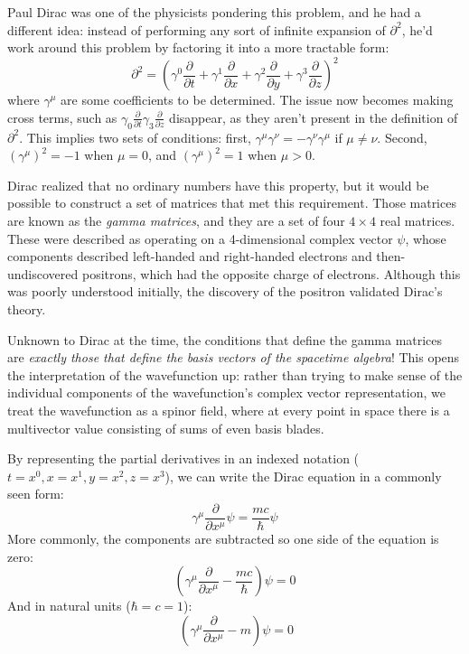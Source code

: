 Paul Dirac was one of the physicists pondering this problem, and he had a different idea: instead of
performing any sort of infinite expansion of $\partial^2$, he'd work around this problem by
factoring it into a more tractable form:
$$
\partial^2 = \left(\gamma^0 \frac{\partial}{\partial t} +
\gamma^1 \frac{\partial}{\partial x} +
\gamma^2 \frac{\partial}{\partial y} +
\gamma^3 \frac{\partial}{\partial z}
\right)^2
$$
where $\gamma^\mu$ are some coefficients to be determined. The issue now becomes making cross terms,
such as $\gamma_0 \frac{\partial}{\partial t} \gamma_3 \frac{\partial}{\partial z}$ disappear, as
they aren't present in the definition of $\partial^2$. This implies two sets of conditions: first,
$\gamma^\mu \gamma^\nu = -\gamma^\nu \gamma^\mu$ if $\mu \neq \nu$. Second, $(\gamma^\mu)^2 = -1$
when $\mu = 0$, and $(\gamma^\mu)^2 = 1$ when $\mu > 0$.

Dirac realized that no ordinary numbers have this property, but it would be possible to construct a
set of matrices that met this requirement. Those matrices are known as the \textit{gamma matrices},
and they are a set of four $4\times4$ real matrices. These were described as operating on a
4-dimensional complex vector $\psi$, whose components described left-handed and right-handed
electrons and then-undiscovered positrons, which had the opposite charge of electrons. Although this
was poorly understood initially, the discovery of the positron validated Dirac's theory.

Unknown to Dirac at the time, the conditions that define the gamma matrices are \textit{exactly
those that define the basis vectors of the spacetime algebra}! This opens the interpretation of the
wavefunction up: rather than trying to make sense of the individual components of the wavefunction's
complex vector representation, we treat the wavefunction as a spinor field, where at every point in
space there is a multivector value consisting of sums of even basis blades.

By representing the partial derivatives in an indexed notation ($t = x^0, x = x^1, y = x^2,
z = x^3$), we can write the Dirac equation in a commonly seen form:
$$
\gamma^\mu \frac{\partial}{\partial x^\mu} \psi = \frac{mc}{\hbar} \psi
$$
More commonly, the components are subtracted so one side of the equation is zero:
$$
\left(\gamma^\mu \frac{\partial}{\partial x^\mu} - \frac{mc}{\hbar}\right) \psi = 0
$$
And in natural units ($\hbar = c = 1$):
$$\
\left(\gamma^\mu \frac{\partial}{\partial x^\mu} - m\right) \psi = 0
$$

